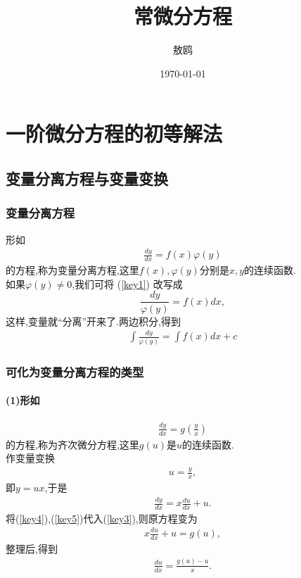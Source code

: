 \documentclass[UTF8]{article}
\begin{document}
\title{常微分方程}
\author{敖鸥}
\date{\today}

\maketitle
{}
\tableofcontents
\newpage

\section{一阶微分方程的初等解法}
\subsection{变量分离方程与变量变换}
\subsubsection{变量分离方程}
形如\\
\begin{align}\label{key1}
\frac{dy}{dx}=f(x)\varphi(y)
\end{align}
的方程,称为变量分离方程,这里$f(x),\varphi(y)$分别是$x,y$的连续函数.\\
如果$\varphi(y) \ne 0$,我们可将 (\ref{key1}) 改写成\\
$$
\frac{dy}{\varphi(y)}=f(x)dx,
$$
这样,变量就“分离”开来了.两边积分,得到\\
\begin{align}\label{key2}
\int {\frac{dy}{\varphi(y)}}=\int{f(x)dx+c} 
\end{align}

\subsubsection{可化为变量分离方程的类型}
\paragraph{(1)形如}
\begin{align}\label{key3}
\frac{dy}{dx}=g(\frac{y}{x})
\end{align}
的方程,称为齐次微分方程,这里$g(u)$是$u$的连续函数.\\
作变量变换
\begin{align}\label{key4}
u=\frac{y}{x},
\end{align}
即$y=ux$,于是
\begin{align}\label{key5}
\frac{dy}{dx}=x \frac{du}{dx}+u.
\end{align}
将(\ref{key4}),(\ref{key5})代入(\ref{key3}),则原方程变为
\begin{align*}
x\frac{du}{dx}+u=g(u),
\end{align*}
整理后,得到
\begin{align}\label{key6}
\frac{du}{dx}=\frac{g(u)-u}{x}.
\end{align}
\end{document}
